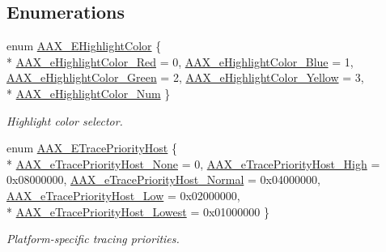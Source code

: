 \subsection*{Enumerations}
\begin{DoxyCompactItemize}
\item 
enum \hyperlink{a00206_a143056a07989a48e5db3a101f1b12567}{A\+A\+X\+\_\+\+E\+Highlight\+Color} \{ \\*
\hyperlink{a00206_a143056a07989a48e5db3a101f1b12567acaa6b8c11b11324277235790607b3656}{A\+A\+X\+\_\+e\+Highlight\+Color\+\_\+\+Red} = 0, 
\hyperlink{a00206_a143056a07989a48e5db3a101f1b12567a91e0f080a5116cb8d9e1a10e5ba2b4a4}{A\+A\+X\+\_\+e\+Highlight\+Color\+\_\+\+Blue} = 1, 
\hyperlink{a00206_a143056a07989a48e5db3a101f1b12567a847fa775f6d9e87fc3c497500ce52fa7}{A\+A\+X\+\_\+e\+Highlight\+Color\+\_\+\+Green} = 2, 
\hyperlink{a00206_a143056a07989a48e5db3a101f1b12567a109077f199737720a75123eec232992f}{A\+A\+X\+\_\+e\+Highlight\+Color\+\_\+\+Yellow} = 3, 
\\*
\hyperlink{a00206_a143056a07989a48e5db3a101f1b12567a59c6a77d15d5837e437de423ca8d3fd4}{A\+A\+X\+\_\+e\+Highlight\+Color\+\_\+\+Num}
 \}
\begin{DoxyCompactList}\small\item\em Highlight color selector. \end{DoxyCompactList}\item 
enum \hyperlink{a00206_a2dd667e4dea5781f38832fd9f1725f1b}{A\+A\+X\+\_\+\+E\+Trace\+Priority\+Host} \{ \\*
\hyperlink{a00206_a2dd667e4dea5781f38832fd9f1725f1ba906b1198b124fa17cd5821cbb140a63f}{A\+A\+X\+\_\+e\+Trace\+Priority\+Host\+\_\+\+None} = 0, 
\hyperlink{a00206_a2dd667e4dea5781f38832fd9f1725f1baac76cc64a1379931edbc2bdc0f8aad66}{A\+A\+X\+\_\+e\+Trace\+Priority\+Host\+\_\+\+High} = 0x08000000, 
\hyperlink{a00206_a2dd667e4dea5781f38832fd9f1725f1ba327226d6962ad7f297506697c2001ce0}{A\+A\+X\+\_\+e\+Trace\+Priority\+Host\+\_\+\+Normal} = 0x04000000, 
\hyperlink{a00206_a2dd667e4dea5781f38832fd9f1725f1ba78edfc70bf7ba33fc5277e4146498c17}{A\+A\+X\+\_\+e\+Trace\+Priority\+Host\+\_\+\+Low} = 0x02000000, 
\\*
\hyperlink{a00206_a2dd667e4dea5781f38832fd9f1725f1baf101af483c232de54b31eba274a07c4c}{A\+A\+X\+\_\+e\+Trace\+Priority\+Host\+\_\+\+Lowest} = 0x01000000
 \}
\begin{DoxyCompactList}\small\item\em Platform-\/specific tracing priorities. \end{DoxyCompactList}\item 

\end{DoxyCompactItemize}
